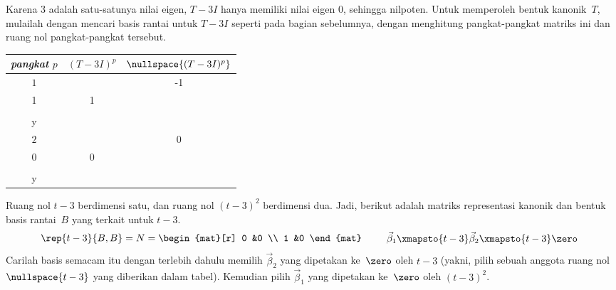 \begin{example}
Karena $3$ adalah satu-satunya nilai eigen,
$T-3I$ hanya memiliki nilai eigen \( 0 \), sehingga nilpoten.
Untuk memperoleh bentuk kanonik~$T$, mulailah dengan
mencari basis rantai untuk $T-3I$
seperti pada bagian sebelumnya, dengan menghitung pangkat-pangkat matriks ini
dan ruang nol pangkat-pangkat tersebut.
\begin{center}
  \begin{tabular}{c|cc}
    \multicolumn{1}{c}{\textit{pangkat} \( p \)}  &\( (T-3I)^p \)  &\( \nullspace{(T-3I)^p}  \)   \\  
    \hline
    \( 1 \)
    &\(  
       \matrixvenlarge{\begin{mat}[r]
         -1  &-1 \\
         1   &1   \\
       \end{mat}}  \)
    &\( \set{\matrixvenlarge{\colvec{-y \\ y}}\suchthat
                               y\in\C}  \)   \\
    \( 2 \)
    &\(  
       \matrixvenlarge{\begin{mat}[r]
         0  &0  \\
         0  &0   \\
       \end{mat}}  \)
    &\( \set{\matrixvenlarge{\colvec{x \\ y}}\suchthat
                               x,y\in\C}  \)   \\
  \end{tabular}
\end{center}
Ruang nol $t-3$ berdimensi satu,
dan ruang nol $(t-3)^2$ berdimensi dua.
Jadi, berikut adalah matriks representasi kanonik dan bentuk
basis rantai~$B$ yang terkait untuk $t-3$.
\begin{equation*}
  \rep{t-3}{B,B}
  =N=
  \begin{mat}[r]
      0  &0   \\
      1  &0
  \end{mat}
  \qquad
  \begin{array}{r}
    \vec{\beta}_1\xmapsto{t-3}\vec{\beta}_2\xmapsto{t-3}\zero  \\
  \end{array}  
\end{equation*}
Carilah basis semacam itu
dengan terlebih dahulu memilih $\vec{\beta}_2$ yang dipetakan ke~$\zero$
oleh $t-3$ (yakni, pilih sebuah anggota
ruang nol $\nullspace{t-3}$ yang diberikan dalam tabel).
Kemudian pilih $\vec{\beta}_1$ yang dipetakan ke~$\zero$ oleh $(t-3)^2$.

\end{example}
